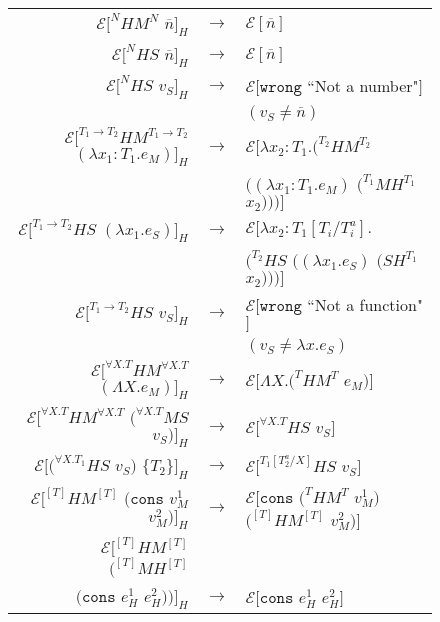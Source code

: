 \begin{figure}[p]
\centering
\begin{tabular}{rcl}
$\mathscr{E}[^{N}HM^{N}$ $\overline{n}]_{H}$ & $\rightarrow$ & $\mathscr{E}[\overline{n}]$ \\
$\mathscr{E}[^{N}HS$ $\overline{n}]_{H}$ & $\rightarrow$ & $\mathscr{E}[\overline{n}]$ \\
$\mathscr{E}[^{N}HS$ $v_{S}]_{H}$ & $\rightarrow$ & $\mathscr{E}[\mathtt{wrong}$ ``Not a number"$]$ \\
&& $(v_{S}\neq\overline{n})$ \\
$\mathscr{E}[^{T_{1}\rightarrow T_{2}}HM^{T_{1}\rightarrow T_{2}}$ $(\lambda x_{1}:T_{1}.e_{M})]_{H}$ & $\rightarrow$ & $\mathscr{E}[\lambda x_{2}:T_{1}.(^{T_{2}}HM^{T_{2}}$ \\
&& $((\lambda x_{1}:T_{1}.e_{M})$ $(^{T_{1}}MH^{T_{1}}$ $x_{2})))]$ \\
$\mathscr{E}[^{T_{1}\rightarrow T_{2}}HS$ $(\lambda x_{1}.e_{S})]_{H}$ & $\rightarrow$ & $\mathscr{E}[\lambda x_{2}:T_{1}[T_{i}/T^{a}_{i}].$ \\
&& $(^{T_{2}}HS$ $((\lambda x_{1}.e_{S})$ $(SH^{T_{1}}$ $x_{2})))]$ \\
$\mathscr{E}[^{T_{1}\rightarrow T_{2}}HS$ $v_{S}]_{H}$ & $\rightarrow$ & $\mathscr{E}[\mathtt{wrong}$ ``Not a function"$]$ \\
&& $(v_{S}\neq\lambda x.e_{S})$ \\
$\mathscr{E}[^{\forall X.T}HM^{\forall X.T}$ $(\Lambda X.e_{M})]_{H}$ & $\rightarrow$ & $\mathscr{E}[\Lambda X.(^{T}HM^{T}$ $e_{M})]$ \\
$\mathscr{E}[^{\forall X.T}HM^{\forall X.T}$ $(^{\forall X.T}MS$ $v_{S})]_{H}$ & $\rightarrow$ & $\mathscr{E}[^{\forall X.T}HS$ $v_{S}]$ \\
$\mathscr{E}[(^{\forall X.T_{1}}HS$ $v_{S})$ $\lbrace T_{2}\rbrace]_{H}$ & $\rightarrow$ & $\mathscr{E}[^{T_{1}[T^{a}_{2}/X]}HS$ $v_{S}]$ \\
$\mathscr{E}[^{[T]}HM^{[T]}$ $(\mathtt{cons}$ $v_{M}^{1}$ $v_{M}^{2})]_{H}$ & $\rightarrow$ & $\mathscr{E}[\mathtt{cons}$ $(^{T}HM^{T}$ $v_{M}^{1})$ $(^{[T]}HM^{[T]}$ $v_{M}^{2})]$ \\
$\mathscr{E}[^{[T]}HM^{[T]}$ $(^{[T]}MH^{[T]}$ && \\
$(\mathtt{cons}$ $e_{H}^{1}$ $e_{H}^{2}))]_{H}$ & $\rightarrow$ & $\mathscr{E}[\mathtt{cons}$ $e_{H}^{1}$ $e_{H}^{2}]$ \\

\end{tabular}
\end{figure}
